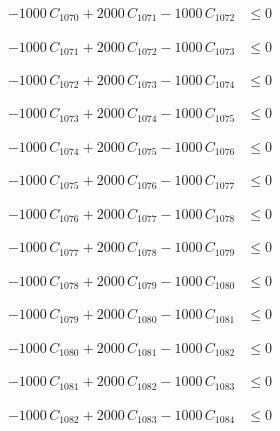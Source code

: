 \documentclass[a4paper,11pt]{article}
\begin{document}
\begin{align}
-1000\,C_{1070} + 2000\,C_{1071} - 1000\,C_{1072} &\leq 0 \nonumber
\end{align}

\begin{align}
-1000\,C_{1071} + 2000\,C_{1072} - 1000\,C_{1073} &\leq 0 \nonumber
\end{align}

\begin{align}
-1000\,C_{1072} + 2000\,C_{1073} - 1000\,C_{1074} &\leq 0 \nonumber
\end{align}

\begin{align}
-1000\,C_{1073} + 2000\,C_{1074} - 1000\,C_{1075} &\leq 0 \nonumber
\end{align}

\begin{align}
-1000\,C_{1074} + 2000\,C_{1075} - 1000\,C_{1076} &\leq 0 \nonumber
\end{align}

\begin{align}
-1000\,C_{1075} + 2000\,C_{1076} - 1000\,C_{1077} &\leq 0 \nonumber
\end{align}

\begin{align}
-1000\,C_{1076} + 2000\,C_{1077} - 1000\,C_{1078} &\leq 0 \nonumber
\end{align}

\begin{align}
-1000\,C_{1077} + 2000\,C_{1078} - 1000\,C_{1079} &\leq 0 \nonumber
\end{align}

\begin{align}
-1000\,C_{1078} + 2000\,C_{1079} - 1000\,C_{1080} &\leq 0 \nonumber
\end{align}

\begin{align}
-1000\,C_{1079} + 2000\,C_{1080} - 1000\,C_{1081} &\leq 0 \nonumber
\end{align}

\begin{align}
-1000\,C_{1080} + 2000\,C_{1081} - 1000\,C_{1082} &\leq 0 \nonumber
\end{align}

\begin{align}
-1000\,C_{1081} + 2000\,C_{1082} - 1000\,C_{1083} &\leq 0 \nonumber
\end{align}

\begin{align}
-1000\,C_{1082} + 2000\,C_{1083} - 1000\,C_{1084} &\leq 0 \nonumber
\end{align}
\end{document}
